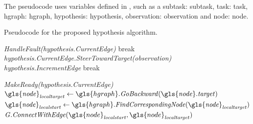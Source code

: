 The pseudocode uses variables defined in , such as a subtask: \gls{subtask}, task: \gls{task}, \ac{hgraph}: \gls{hgraph}, hypothesis: \gls{hypothesis}, observation: \gls{observation} and node: \gls{node}.\bs

\noindent
\begin{algorithm}[H]
  \caption{Pseudocode for the proposed hypothesis algorithm.}\label{pseudocode:halgorithm}
  \begin{algorithmic}[1]

    \hspace{-0.9cm}\colorbox{my_grey}{\parbox{\linewidth}{%

        \hspace{-0.1cm}\colorbox{my_yellow}{\parbox{\linewidth}{%

            \hspace{-0.1cm}\colorbox{my_light_blue}{\parbox{\linewidth}{%
                 
                \State \textit{HandleFault(\gls{hypothesis}.CurrentEdge)}
                \State break
                \EndIf
                \State \textit{\gls{hypothesis}.CurrentEdge.SteerTowardTarget(\gls{observation})}
                  \State \textit{\gls{hypothesis}.IncrementEdge}
                \Else
                  \State break
                \EndIf
                \EndIf
                \EndWhile
            }}
            \Else
            \State \textit{MakeReady(\gls{hypothesis}.CurrentEdge)}
            \EndIf
            \Else
            \State $\mathit{\gls{node}_{localtarget}} \leftarrow \gls{hgraph}.\mathit{GoBackward(\gls{node}.target)}$
            \State $\mathit{\gls{node}_{localstart}} \leftarrow \gls{hgraph}.\mathit{FindCorrespondingNode(\gls{node}_{localtarget})}$
            \State $\mathit{G.ConnectWithEdge}(\gls{node}_\mathit{localstart}, \gls{node}_\mathit{localtarget})$
            \EndIf
            \EndWhile
        }}
        \EndFor
    }}
  \end{algorithmic}
\end{algorithm}

